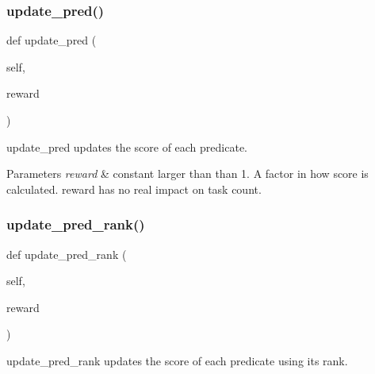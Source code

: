 \mbox{\label{classdynamicfilterapp_1_1models_1_1_predicate_a10d89924e071640aee4eedd86662e505}} 
\subsubsection{\texorpdfstring{update\+\_\+pred()}{update\_pred()}}
{\footnotesize\ttfamily def update\+\_\+pred (\begin{DoxyParamCaption}\item[{}]{self,  }\item[{}]{reward }\end{DoxyParamCaption})}



update\+\_\+pred updates the score of each predicate. 


\begin{DoxyParams}{Parameters}
{\em reward} & constant larger than than 1. A factor in how score is calculated. reward has no real impact on task count. \\
\hline
\end{DoxyParams}
\mbox{\label{classdynamicfilterapp_1_1models_1_1_predicate_a8945ec4943839cc7dc37954ae33e2397}} 
\subsubsection{\texorpdfstring{update\+\_\+pred\+\_\+rank()}{update\_pred\_rank()}}
{\footnotesize\ttfamily def update\+\_\+pred\+\_\+rank (\begin{DoxyParamCaption}\item[{}]{self,  }\item[{}]{reward }\end{DoxyParamCaption})}



update\+\_\+pred\+\_\+rank updates the score of each predicate using its rank. 


